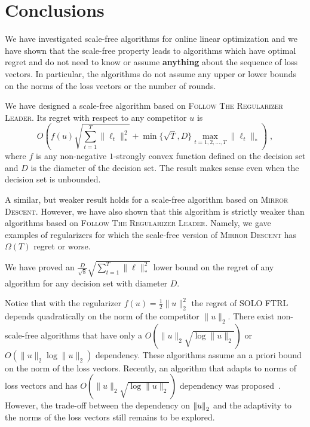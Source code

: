 \section{Conclusions}
\label{section:conclusions}

We have investigated scale-free algorithms for online linear optimization and
we have shown that the scale-free property leads to algorithms which have optimal
regret and do not need to know or assume \textbf{anything} about the sequence
of loss vectors. In particular, the algorithms do not assume any upper or lower
bounds on the norms of the loss vectors or the number of rounds.

We have designed a scale-free algorithm based on \textsc{Follow The Regularizer
Leader}. Its regret with respect to any competitor $u$ is
$$
O \left(f(u) \sqrt{\sum_{t=1}^T \|\ell_t\|_*^2}
+ \min\{\sqrt{T}, D\} \max_{t=1,2,\dots,T} \|\ell_t\|_* \right) \; ,
$$
where $f$ is any non-negative $1$-strongly convex
function defined on the decision set and $D$ is the diameter of the decision
set. The result makes sense even when the decision set is unbounded.

A similar, but weaker result holds for a scale-free algorithm based on
\textsc{Mirror Descent}. However, we have also shown that this algorithm is
strictly weaker than algorithms based on \textsc{Follow The Regularizer Leader}.
Namely, we gave examples of regularizers for which the scale-free version of
\textsc{Mirror Descent} has $\Omega(T)$ regret or worse.

We have proved an $\frac{D}{\sqrt{8}} \sqrt{\sum_{t=1}^T \|\ell\|_*^2}$ lower
bound on the regret of any algorithm for any decision set with diameter $D$.

Notice that with the regularizer $f(u) = \frac{1}{2}\|u\|_2^2$ the regret of
\textsc{SOLO FTRL} depends quadratically on the norm of the competitor
$\|u\|_2$. There exist non-scale-free algorithms \cite{McMahan-Streeter-2012,
McMahan-Abernethy-2013, Orabona-2013, McMahan-Orabona-2014, Orabona-2014,
Orabona-Pal-2016} that have only a $O(\|u\|_2 \sqrt{\log \|u\|_2})$ or
$O(\|u\|_2 \log \|u\|_2)$ dependency.  These algorithms assume an a priori bound
on the norm of the loss vectors. Recently, an algorithm that adapts to norms of
loss vectors and has $O(\|u\|_2 \sqrt{\log \|u\|_2})$ dependency was
proposed~\cite{Cutkosky-Boahen-2016}. However, the trade-off between the
dependency on ${\left\|{u}\right\|}_2$ and the adaptivity to the norms of the loss vectors
still remains to be explored.
